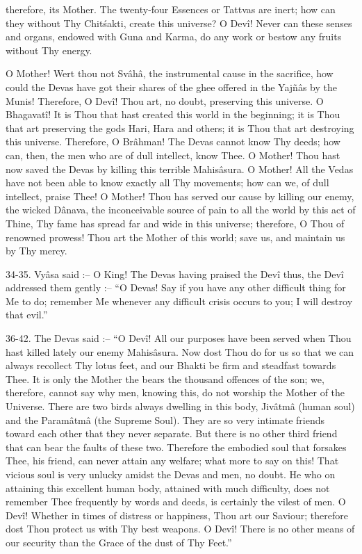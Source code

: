 therefore, its Mother. The twenty-four Essences or Tattvas are inert; how can they without Thy Chit\'sakti, create this universe? O Dev\^i! Never can these senses and organs, endowed with Guna and Karma, do any work or bestow any fruits without Thy energy.

O Mother! Wert thou not Sv\^ah\^a, the instrumental cause in the sacrifice, how could the Devas have got their shares of the ghee offered in the Yajñ\^as by the Munis! Therefore, O Dev\^i! Thou art, no doubt, preserving this universe. O Bhagavat\^i! It is Thou that hast created this world in the beginning; it is Thou that art preserving the gods Hari, Hara and others; it is Thou that art destroying this universe. Therefore, O Br\^ahman! The Devas cannot know Thy deeds; how can, then, the men who are of dull intellect, know Thee. O Mother! Thou hast now saved the Devas by killing this terrible Mahis\^asura. O Mother! All the Vedas have not been able to know exactly all Thy movements; how can we, of dull intellect, praise Thee! O Mother! Thou has served our cause by killing our enemy, the wicked D\^anava, the inconceivable source of pain to all the world by this act of Thine, Thy fame has spread far and wide in this universe; therefore, O Thou of renowned prowess! Thou art the Mother of this world; save us, and maintain us by Thy mercy.

34-35. Vy\^asa said :-- O King! The Devas having praised the Dev\^i thus, the Dev\^i addressed them gently :-- ``O Devas! Say if you have any other difficult thing for Me to do; remember Me whenever any difficult crisis occurs to you; I will destroy that evil.''

36-42. The Devas said :-- ``O Dev\^i! All our purposes have been served when Thou hast killed lately our enemy Mahis\^asura. Now dost Thou do for us so that we can always recollect Thy lotus feet, and our Bhakti be firm and steadfast towards Thee. It is only the Mother the bears the thousand offences of the son; we, therefore, cannot say why men, knowing this, do not worship the Mother of the Universe. There are two birds always dwelling in this body, Jiv\^atm\^a (human soul) and the Param\^atm\^a (the Supreme Soul). They are so very intimate friends toward each other that they never separate. But there is no other third friend that can bear the faults of these two. Therefore the embodied soul that forsakes Thee, his friend, can never attain any welfare; what more to say on this! That vicious soul is very unlucky amidst the Devas and men, no doubt. He who on attaining this excellent human body, attained with much difficulty, does not remember Thee frequently by words and deeds, is certainly the vilest of men. O Dev\^i! Whether in times of distress or happiness, Thou art our Saviour; therefore dost Thou protect us with Thy best weapons. O Dev\^i! There is no other means of our security than the Grace of the dust of Thy Feet.''

